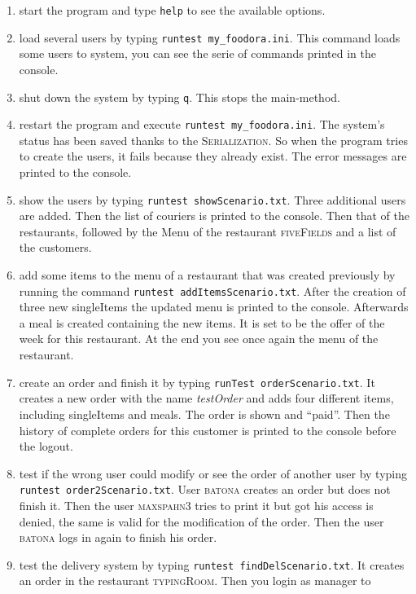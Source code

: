 \begin{enumerate}[itemsep=0mm]
	\item start the program and type \lstinline|help| to see the available options.
	\item load several users by typing \lstinline|runtest my_foodora.ini|. This command loads 
		some users to system, you can see the serie of commands printed in the console.
	\item shut down the system by typing \lstinline|q|. This stops the main-method.
	\item restart the program and execute \lstinline|runtest my_foodora.ini|. The system's 
		status has been saved thanks to the \textsc{Serialization}. So when the program tries
		to create the users, it fails because they already exist. The error messages are 
		printed to the console.
	\item show the users by typing \lstinline|runtest showScenario.txt|. Three additional users
		are added. Then the list of couriers is printed to the console. Then that of the 
		restaurants, followed by the Menu of the restaurant \textsc{fiveFields} and a list of
		the customers.
	\item add some items to the menu of a restaurant that was created previously by running the 
		command \lstinline|runtest addItemsScenario.txt|. After the creation of three new 
		singleItems the updated menu is printed to the console. Afterwards a meal is created
		containing the new items. It is set to be the offer of the week for this restaurant.
		At the end you see once again the menu of the restaurant.
	\item create an order and finish it by typing \lstinline|runTest orderScenario.txt|. It 
		creates a new order with the name \textit{testOrder} and adds four different items, 
		including singleItems and meals. The order is shown and ``paid''. Then the history
		of complete orders for this customer is printed to the console before the logout.
	\item test if the wrong user could modify or see the order of another user by typing
		\lstinline|runtest order2Scenario.txt|. User \textsc{batona} creates an order but 
		does not finish it. Then the user \textsc{maxspahn3} tries to print it but got his
		access is denied, the same is valid for the modification of the order. Then the 
		user \textsc{batona} logs in again to finish his order.
	\item test the delivery system by typing \lstinline|runtest findDelScenario.txt|. It creates
		an order in the restaurant \textsc{typingRoom}. Then you login as manager to 

\end{enumerate}
